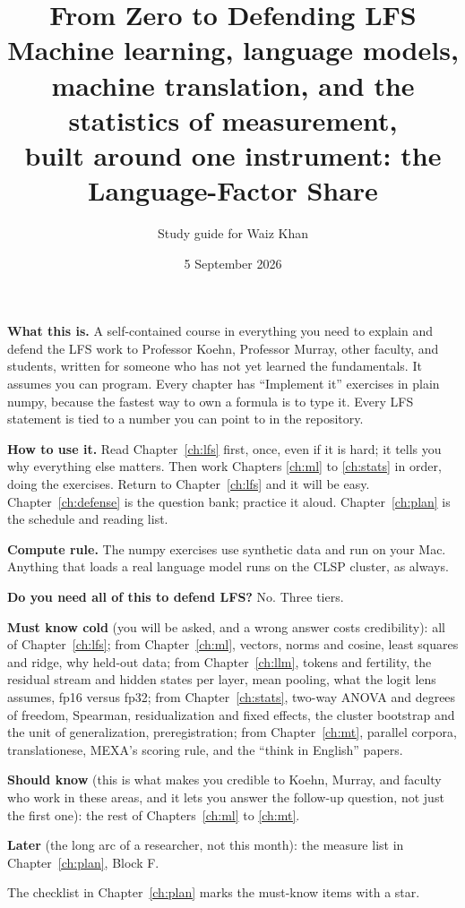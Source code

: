 \documentclass[11pt,letterpaper]{article}
\title{\textbf{From Zero to Defending LFS}\\[2mm]
\large Machine learning, language models, machine translation, and the statistics of measurement,\\
built around one instrument: the Language-Factor Share}
\author{Study guide for Waiz Khan}
\date{5 September 2026}
\newenvironment{keybox}{\def\FrameCommand{\fboxsep=8pt\colorbox{boxbg}}\MakeFramed{\advance\hsize-\width\FrameRestore}}{\endMakeFramed}
\begin{document}
\maketitle

\begin{keybox}
\textbf{What this is.} A self-contained course in everything you need to
explain and defend the LFS work to Professor Koehn, Professor Murray, other
faculty, and students, written for someone who has not yet learned the
fundamentals. It assumes you can program. Every chapter has ``Implement
it'' exercises in plain numpy, because the fastest way to own a formula is to
type it. Every LFS statement is tied to a number you can point to in the
repository.

\textbf{How to use it.} Read Chapter~\ref{ch:lfs} first, once, even if it is
hard; it tells you why everything else matters. Then work Chapters
\ref{ch:ml} to \ref{ch:stats} in order, doing the exercises. Return to
Chapter~\ref{ch:lfs} and it will be easy. Chapter~\ref{ch:defense} is the
question bank; practice it aloud. Chapter~\ref{ch:plan} is the schedule and
reading list.

\textbf{Compute rule.} The numpy exercises use synthetic data and run on your
Mac. Anything that loads a real language model runs on the CLSP cluster, as
always.
\end{keybox}

\begin{keybox}
\textbf{Do you need all of this to defend LFS?} No. Three tiers.

\textbf{Must know cold} (you will be asked, and a wrong answer costs
credibility): all of Chapter~\ref{ch:lfs}; from Chapter~\ref{ch:ml}, vectors,
norms and cosine, least squares and ridge, why held-out data; from
Chapter~\ref{ch:llm}, tokens and fertility, the residual stream and hidden
states per layer, mean pooling, what the logit lens assumes, fp16 versus
fp32; from Chapter~\ref{ch:stats}, two-way ANOVA and degrees of freedom,
Spearman, residualization and fixed effects, the cluster bootstrap and the
unit of generalization, preregistration; from Chapter~\ref{ch:mt}, parallel
corpora, translationese, MEXA's scoring rule, and the ``think in English''
papers.

\textbf{Should know} (this is what makes you credible to Koehn, Murray, and
faculty who work in these areas, and it lets you answer the follow-up
question, not just the first one): the rest of Chapters~\ref{ch:ml} to
\ref{ch:mt}.

\textbf{Later} (the long arc of a researcher, not this month): the measure
list in Chapter~\ref{ch:plan}, Block F.

The checklist in Chapter~\ref{ch:plan} marks the must-know items with a
star.
\end{keybox}

\tableofcontents
\clearpage


\clearpage

\clearpage

\clearpage

\clearpage

\clearpage

\clearpage

\clearpage

\clearpage

\end{document}

